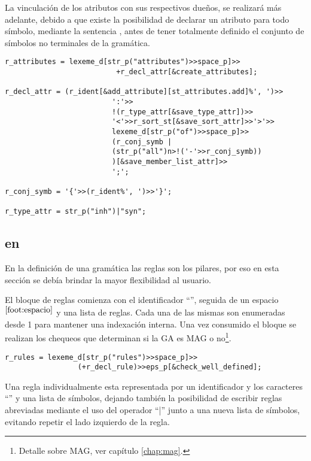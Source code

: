 La vinculación de los atributos con sus respectivos dueños, se realizará más adelante, debido a que existe la posibilidad de declarar un atributo para todo símbolo, mediante la sentencia , antes de tener totalmente definido el conjunto de símbolos no terminales de la gramática.

\begin{lstlisting}[columns=fullflexible, linewidth=12cm]
r_attributes = lexeme_d[str_p("attributes")>>space_p]>>
                          +r_decl_attr[&create_attributes];

r_decl_attr = (r_ident[&add_attribute][st_attributes.add]%', ')>>
                         ':'>>
                         !(r_type_attr[&save_type_attr])>>
                         '<'>>r_sort_st[&save_sort_attr]>>'>'>>
                         lexeme_d[str_p("of")>>space_p]>>
                         (r_conj_symb |
                         (str_p("all")n>!('-'>>r_conj_symb))
                         )[&save_member_list_attr]>>
                         ';';

r_conj_symb = '{'>>(r_ident%', ')>>'}';

r_type_attr = str_p("inh")|"syn";
\end{lstlisting}

\subsection{ en \spirit}

En la definición de una gramática las reglas son los pilares, por eso en esta sección se debía brindar la mayor flexibilidad al usuario.

El bloque de reglas comienza con el identificador ``'', seguida de un espacio$^{\ref{foot:espacio}}$ y una lista de reglas. Cada una de las mismas son enumeradas desde 1 para mantener una indexación interna. Una vez consumido el bloque se realizan los chequeos que determinan si la GA es MAG o no\footnote{Detalle sobre MAG, ver capítulo \ref{chap:mag}.}.

\begin{lstlisting}[columns=fullflexible, linewidth=10cm]
r_rules = lexeme_d[str_p("rules")>>space_p]>>
                 (+r_decl_rule)>>eps_p[&check_well_defined];
\end{lstlisting}

Una regla individualmente esta representada por un identificador y los caracteres ``\textttb{::=}'' y una lista de símbolos, dejando también la posibilidad de escribir reglas abreviadas mediante el uso del operador ``|'' junto a una nueva lista de símbolos, evitando repetir el lado izquierdo de la regla.

